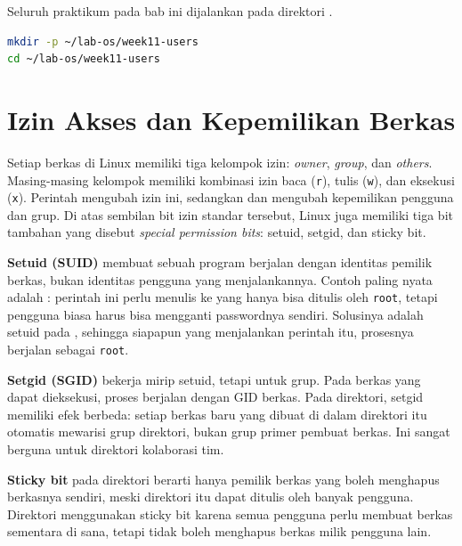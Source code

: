 \begin{notebox}
Seluruh praktikum pada bab ini dijalankan pada direktori .
\begin{lstlisting}[language=bash]
mkdir -p ~/lab-os/week11-users
cd ~/lab-os/week11-users
\end{lstlisting}
\end{notebox}

\section{Izin Akses dan Kepemilikan Berkas}
\label{sec:advanced-permissions}

Setiap berkas di Linux memiliki tiga kelompok izin: \textit{owner}, \textit{group}, dan \textit{others}. Masing-masing kelompok memiliki kombinasi izin baca (\texttt{r}), tulis (\texttt{w}), dan eksekusi (\texttt{x}). Perintah  mengubah izin ini, sedangkan  dan  mengubah kepemilikan pengguna dan grup. Di atas sembilan bit izin standar tersebut, Linux juga memiliki tiga bit tambahan yang disebut \textit{special permission bits}: setuid, setgid, dan sticky bit.

\textbf{Setuid (SUID)} membuat sebuah program berjalan dengan identitas pemilik berkas, bukan identitas pengguna yang menjalankannya. Contoh paling nyata adalah : perintah ini perlu menulis ke  yang hanya bisa ditulis oleh \texttt{root}, tetapi pengguna biasa harus bisa mengganti passwordnya sendiri. Solusinya adalah setuid pada , sehingga siapapun yang menjalankan perintah itu, prosesnya berjalan sebagai \texttt{root}.

\textbf{Setgid (SGID)} bekerja mirip setuid, tetapi untuk grup. Pada berkas yang dapat dieksekusi, proses berjalan dengan GID berkas. Pada direktori, setgid memiliki efek berbeda: setiap berkas baru yang dibuat di dalam direktori itu otomatis mewarisi grup direktori, bukan grup primer pembuat berkas. Ini sangat berguna untuk direktori kolaborasi tim.

\textbf{Sticky bit} pada direktori berarti hanya pemilik berkas yang boleh menghapus berkasnya sendiri, meski direktori itu dapat ditulis oleh banyak pengguna. Direktori  menggunakan sticky bit karena semua pengguna perlu membuat berkas sementara di sana, tetapi tidak boleh menghapus berkas milik pengguna lain.

